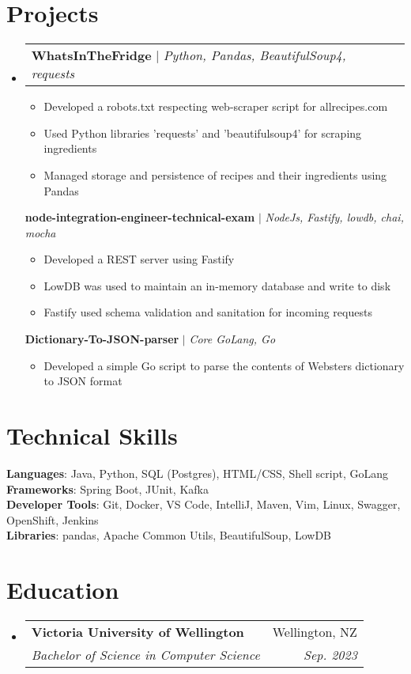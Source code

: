 \documentclass[letterpaper,11pt]{article}
\makeatletter
\newcommand{\resumeItem}[1]{
  \item\small{
    {#1 \vspace{-2pt}}
  }
}
\newcommand{\resumeSubheading}[4]{
  \vspace{-2pt}\item
    \begin{tabular*}{0.97\textwidth}[t]{l@{\extracolsep{\fill}}r}
      \textbf{#1} & #2 \\
      \textit{\small#3} & \textit{\small #4} \\
    \end{tabular*}\vspace{-7pt}
}
\newcommand{\resumeProjectHeading}[2]{
    \item
    \begin{tabular*}{0.97\textwidth}{l@{\extracolsep{\fill}}r}
      \small#1 & #2 \\
    \end{tabular*}\vspace{-7pt}
}
\newcommand{\resumeSubHeadingListStart}{\begin{itemize}[leftmargin=0.15in, label={}]}
\newcommand{\resumeSubHeadingListEnd}{\end{itemize}}
\newcommand{\resumeItemListStart}{\begin{itemize}\vspace{0pt}}
\newcommand{\resumeItemListEnd}{\end{itemize}\vspace{0pt}}
\makeatother
\begin{document}
\section{Projects}
    \resumeSubHeadingListStart
      \resumeProjectHeading
        {\textbf{WhatsInTheFridge{\vspace{5pt}}} $|$ \emph{Python, Pandas, BeautifulSoup4, requests}}{}
          \resumeItemListStart
            \resumeItem{Developed a robots.txt respecting web-scraper script for allrecipes.com}
            \resumeItem{Used Python libraries 'requests' and 'beautifulsoup4' for scraping ingredients}
            \resumeItem{Managed storage and persistence of recipes and their ingredients using Pandas}
          \resumeItemListEnd
        {\textbf{node-integration-engineer-technical-exam} $|$ \emph{NodeJs, Fastify, lowdb, chai, mocha}}{}
          \resumeItemListStart
            \resumeItem{Developed a REST server using Fastify}
            \resumeItem{LowDB was used to maintain an in-memory database and write to disk}
            \resumeItem{Fastify used schema validation and sanitation for incoming requests}
          \resumeItemListEnd
        {\textbf{Dictionary-To-JSON-parser} $|$ \emph{Core GoLang, Go}}{}
          \resumeItemListStart
            \resumeItem{Developed a simple Go script to parse the contents of Websters dictionary to JSON format}
          \resumeItemListEnd
    \resumeSubHeadingListEnd



%
\section{Technical Skills}
 \begin{itemize}[leftmargin=0.15in, label={}]
    \small{\item{
     \textbf{Languages}{: Java, Python, SQL (Postgres), HTML/CSS, Shell script, GoLang} \\
     \textbf{Frameworks}{: Spring Boot, JUnit, Kafka} \\
     \textbf{Developer Tools}{: Git, Docker, VS Code, IntelliJ, Maven, Vim, Linux, Swagger, OpenShift, Jenkins} \\
     \textbf{Libraries}{: pandas, Apache Common Utils, BeautifulSoup, LowDB}
    }}
 \end{itemize}


\section{Education}
  \resumeSubHeadingListStart
    \resumeSubheading
      {Victoria University of Wellington}{Wellington, NZ}
      {Bachelor of Science in Computer Science}{Sep. 2023}
      
  \resumeSubHeadingListEnd

\end{document}
